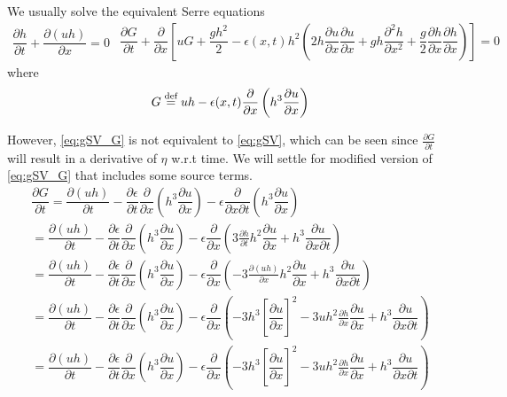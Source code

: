 \documentclass[10pt]{article}
\newcommand{\defn}{\stackrel{\textrm{\scriptsize def}}{=}}
\begin{document}
We usually solve the equivalent Serre equations
\begin{subequations}
\begin{gather}
\dfrac{\partial h}{\partial t} + \dfrac{\partial (uh)}{\partial x} = 0
\label{eq:gSV_Ga}
\end{gather}
\begin{gather}
\dfrac{\partial G}{\partial t} + \dfrac{\partial }{\partial x} \left[ uG + \dfrac{gh^2}{2} - \epsilon(x,t) h^2\left ( 2 h \dfrac{\partial u}{\partial x} \dfrac{\partial u}{\partial x} + gh \dfrac{\partial^2h}{\partial x^2} +\dfrac{g}{2} \dfrac{\partial h}{\partial x}\dfrac{\partial h}{\partial x} \right ) \right]= 0
\label{eq:gSV_Gb}
\end{gather}
\label{eq:gSV_G}
\end{subequations}
where
\begin{gather*}
G \defn uh - \epsilon(x,t)\dfrac{\partial }{\partial x} \left (h^3 \dfrac{\partial u}{\partial x} \right )
\end{gather*}

However, \eqref{eq:gSV_G} is not equivalent to \eqref{eq:gSV}, which can be seen since $\frac{\partial G}{\partial t}$ will result in a derivative of $\eta$ w.r.t time. We will settle for modified version of \eqref{eq:gSV_G} that includes some source terms.
\begin{multline}
\dfrac{\partial G}{\partial t} = \dfrac{\partial (uh)}{\partial t} -\dfrac{\partial \epsilon}{\partial t}\dfrac{\partial }{\partial x} \left (h^3 \dfrac{\partial u}{\partial x} \right ) - \epsilon\dfrac{\partial }{\partial x \partial t} \left (h^3 \dfrac{\partial u}{\partial x} \right )\\
= \dfrac{\partial (uh)}{\partial t} -\dfrac{\partial \epsilon}{\partial t}\dfrac{\partial }{\partial x} \left (h^3 \dfrac{\partial u}{\partial x} \right ) - \epsilon\dfrac{\partial }{ \partial x} \left (3\frac{\partial h}{\partial t}h^2 \dfrac{\partial u}{\partial x} + h^3 \dfrac{\partial u}{\partial x \partial t} \right )\\
= \dfrac{\partial (uh)}{\partial t} -\dfrac{\partial \epsilon}{\partial t}\dfrac{\partial }{\partial x} \left (h^3 \dfrac{\partial u}{\partial x} \right ) - \epsilon\dfrac{\partial }{ \partial x} \left(-3\frac{\partial (uh)}{\partial x}h^2 \dfrac{\partial u}{\partial x} + h^3 \dfrac{\partial u}{\partial x \partial t} \right)\\
= \dfrac{\partial (uh)}{\partial t} -\dfrac{\partial \epsilon}{\partial t}\dfrac{\partial }{\partial x} \left (h^3 \dfrac{\partial u}{\partial x} \right ) - \epsilon\dfrac{\partial }{ \partial x} \left (-3h^3 \left[\dfrac{\partial u}{\partial x}\right]^2 -3uh^2 \frac{\partial h}{\partial x}\dfrac{\partial u}{\partial x} + h^3 \dfrac{\partial u}{\partial x \partial t} \right ) \\
= \dfrac{\partial (uh)}{\partial t} -\dfrac{\partial \epsilon}{\partial t}\dfrac{\partial }{\partial x} \left (h^3 \dfrac{\partial u}{\partial x} \right ) - \epsilon\dfrac{\partial }{ \partial x} \left (-3h^3 \left[\dfrac{\partial u}{\partial x}\right]^2 -3uh^2 \frac{\partial h}{\partial x}\dfrac{\partial u}{\partial x} + h^3 \dfrac{\partial u}{\partial x \partial t} \right ) 
\end{multline}
\end{document}
